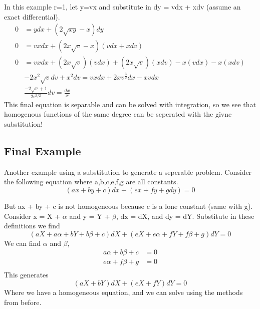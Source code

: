 \documentclass{article}
\newcommand{\be}{\begin{equation}}
\newcommand{\ee}{\end{equation}}
\begin{document}
In this example r=1, let y=vx and substitute in dy = vdx + xdv (assume an exact differential).
\be
\begin{split}
    0 &= ydx + (2\sqrt{xy} - x) dy\\
    0 &= vxdx + (2x\sqrt{v} - x) (vdx + xdv)\\
    0 &= vxdx + (2x\sqrt{v})(vdx) + (2x\sqrt{v})(xdv) - x(vdx) - x(xdv)\\
    &-2x^2\sqrt{v}dv + x^2dv = vxdx + 2xv^{\frac{3}{2}}dx - xvdx \\
    & \frac{-2\sqrt{v}+1}{2v^{3/2}}dv = \frac{dx}{x}
\end{split}
\ee
This final equation is separable and can be solved with integration, so we see that homogenous functions of the same degree can be seperated with the givne substitution!

\subsection*{Final Example}
Another example using a substitution to generate a seperable problem. 
Consider the following equation where a,b,c,e,f,g are all constants.
\be
(ax + by + c) dx + (ex + fy + g dy) = 0
\ee

But ax + by + c is not homogeneous because c is a lone constant (same with g).
Consider x = X + $\alpha$ and y = Y + $\beta$, dx = dX, and dy = dY.
Substitute in these definitions we find
\be
(aX + a\alpha + bY + b\beta + c) dX + (eX + e\alpha + fY + f\beta + g) dY = 0
\ee
We can find $\alpha$ and $\beta$,
\be
\begin{split}
    a\alpha + b\beta + c &= 0 \\
    e\alpha + f\beta + g &= 0 \\
\end{split}
\ee
This generates
\be
(aX + bY)dX + (eX + fY)dY = 0
\ee
Where we have a homogeneous equation, and we can solve using the methods from before.
\end{document}
